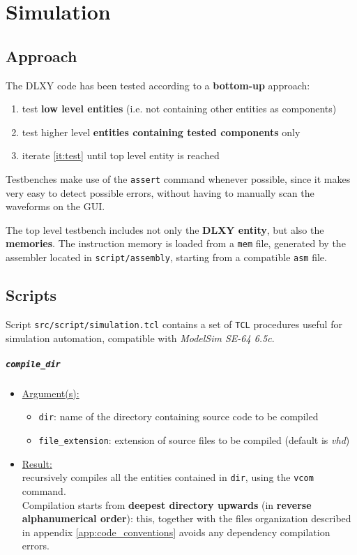 \chapter{Simulation}
\label{chap:simulation}

\section{Approach}
The DLXY code has been tested according to a \textbf{bottom-up} approach:
\begin{enumerate}
	\item test \textbf{low level entities} (i.e. not containing other
		entities as components)
	\item \label{it:test} test higher level \textbf{entities containing
		tested components} only
	\item iterate \ref{it:test} until top level entity is reached
\end{enumerate}

Testbenches make use of the \texttt{assert} command whenever possible, since
it makes very easy to detect possible errors, without having to manually scan
the waveforms on the GUI.

\bigskip
The top level testbench includes not only the \textbf{DLXY entity}, but also the
\textbf{memories}. The instruction memory is loaded from a \texttt{mem} file,
generated by the assembler located in \texttt{script/assembly}, starting from
a compatible \texttt{asm} file.

\section{Scripts}
Script \texttt{src/script/simulation.tcl} contains a set of \texttt{TCL}
procedures useful for simulation automation, compatible with
\textit{ModelSim SE-64 6.5c}.

\paragraph{\texttt{compile\_dir}}
\begin{itemize}
	\item \underline{Argument(s):}
		\begin{itemize}
			\item \texttt{dir}: name of the directory containing
				source code to be compiled
			\item \texttt{file\_extension}: extension of source files
				to be compiled (default is \textit{vhd})
		\end{itemize}
	\item \underline{Result:} \\
		recursively compiles all the entities contained in \texttt{dir},
		using the \texttt{vcom} command. \\
		Compilation starts from \textbf{deepest directory upwards} (in
		\textbf{reverse alphanumerical order}): this, together with the
		files organization described in appendix
		\ref{app:code_conventions} avoids any dependency compilation errors.
\end{itemize}

